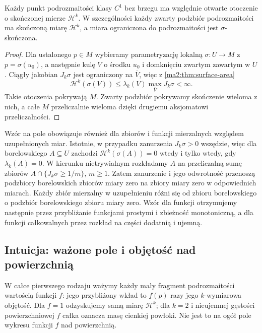 \begin{wniosek}
\label{ma2:cor:surface-local-finite}
Każdy punkt podrozmaitości klasy $C^1$ bez brzegu
ma względnie otwarte otoczenie o skończonej
mierze $\mathcal H^k$. W szczególności każdy
zwarty podzbiór podrozmaitości ma skończoną
miarę $\mathcal H^k$, a miara ograniczona do
podrozmaitości jest $\sigma$-skończona.
\end{wniosek}
\begin{proof}
Dla ustalonego $p\in M$ wybieramy parametryzację
lokalną $\sigma:U\to M$ z $p=\sigma(u_0)$,
a następnie kulę $V$ o środku $u_0$ i domknięciu
zwartym zawartym w $U$. Ciągły jakobian $J_k\sigma$
jest ograniczony na $\overline V$, więc
z \ref{ma2:thm:surface-area}
\[
 \mathcal H^k(\sigma(V))
 \le\lambda_k(V)\max_{\overline V}J_k\sigma<\infty.
\]
Takie otoczenia pokrywają $M$. Zwarty podzbiór
pokrywamy skończenie wieloma z nich, a całe $M$
przeliczalnie wieloma dzięki drugiemu aksjomatowi
przeliczalności.
\end{proof}

Wzór na pole obowiązuje również dla zbiorów
i funkcji mierzalnych względem uzupełnionych
miar. Istotnie, w przypadku zanurzenia
$J_k\sigma>0$ wszędzie, więc dla borelowskiego
$A\subseteq U$ zachodzi
$\mathcal H^k(\sigma(A))=0$ wtedy i tylko wtedy,
gdy $\lambda_k(A)=0$. W kierunku nietrywialnym
rozkładamy $A$ na przeliczalną sumę zbiorów
$A\cap\{J_k\sigma\ge1/m\}$, $m\ge1$.
Zatem zanurzenie i jego odwrotność przenoszą
podzbiory borelowskich zbiorów miary zero
na zbiory miary zero w odpowiednich miarach.
Każdy zbiór mierzalny w uzupełnieniu różni się
od zbioru borelowskiego o podzbiór borelowskiego
zbioru miary zero. Wzór dla funkcji otrzymujemy
następnie przez przybliżanie funkcjami prostymi
i zbieżność monotoniczną, a dla funkcji
całkowalnych przez rozkład na części dodatnią
i ujemną.


\subsection{Intuicja: ważone pole i objętość nad powierzchnią}
\label{ma2:sec:surface-weighted-intuition}

W całce pierwszego rodzaju ważymy każdy mały fragment
podrozmaitości wartością funkcji $f$:
jego przybliżony wkład to $f(p)$ razy jego
$k$-wymiarowa objętość. Dla $f=1$ odzyskujemy
samą miarę $\mathcal H^k$; dla $k=2$ i nieujemnej
gęstości powierzchniowej $f$ całka oznacza masę
cienkiej powłoki. Nie jest to na ogół pole wykresu
funkcji $f$ nad powierzchnią.

